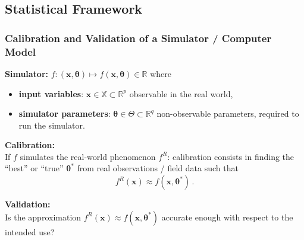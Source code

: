 \documentclass[nopagenumber,9pt]{beamer}
\newcommand{\btheta}{\boldsymbol{\theta}}
\newcommand{\bx}{\mathbf{x}}
\begin{document}
\subsection{Statistical Framework}
\begin{frame}
 \frametitle{Calibration and Validation of a Simulator / Computer Model}

 \textbf{Simulator:}
$f:(\bx,\btheta)\mapsto f(\bx,\btheta)\in \mathbb{R} $ where\\
\medskip
\begin{itemize}
  \item \textbf{input variables}: $\bx\in  \mathbb{X}\subset\mathbb{R}^p$ observable  in the real world,
  \smallskip
  \item \textbf{simulator parameters}: $\btheta\in \Theta\subset\mathbb{R}^q$ non-observable parameters, required to run the simulator.
\smallskip

\end{itemize}

  \bigskip

%


  \textbf{Calibration:}\\
  If $f$ simulates
  the real-world phenomenon $f^R$:
  calibration consists in finding the ``best'' or ``true'' $\btheta^*$ from real observations / field data such that
  $$f^R(\bx)\approx f(\bx,\btheta^*)\,.$$


  \textbf{Validation:}\\
  Is the approximation $f^R(\bx)\approx f(\bx,\btheta^*)$ accurate enough with respect to the intended use?



\end{frame}
\end{document}

